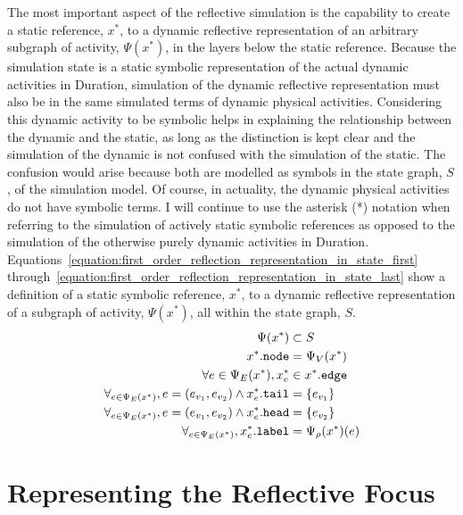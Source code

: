 The most important aspect of the reflective simulation is the
capability to create a static reference, $x^*$, to a dynamic
reflective representation of an arbitrary subgraph of activity,
$\Psi(x^*)$, in the layers below the static reference.  Because the
simulation state is a static symbolic representation of the actual
dynamic activities in Duration, simulation of the dynamic reflective
representation must also be in the same simulated terms of dynamic
physical activities.  Considering this dynamic activity to be symbolic
helps in explaining the relationship between the dynamic and the
static, as long as the distinction is kept clear and the simulation of
the dynamic is not confused with the simulation of the static.  The
confusion would arise because both are modelled as symbols in the
state graph, $S$, of the simulation model.  Of course, in actuality,
the dynamic physical activities do not have symbolic terms.  I will
continue to use the asterisk (*) notation when referring to the
simulation of actively static symbolic references as opposed to the
simulation of the otherwise purely dynamic activities in Duration.
{\mbox{Equations~\ref{equation:first_order_reflection_representation_in_state_first}}}
{\mbox{through~\ref{equation:first_order_reflection_representation_in_state_last}}}
show a definition of a static symbolic reference, $x^*$, to a dynamic
reflective representation of a subgraph of activity, $\Psi(x^*)$, all
within the state graph, $S$.
\begin{align}
\label{equation:first_order_reflection_representation_in_state_first}
                                                                    \Psi(x^*) &\subset S \\
                                                         x^*.\text{\tt{node}} &= \Psi_V(x^*) \\
                                               \forall e \in \Psi_E(x^*), x^*_e &\in x^*.\text{\tt{edge}} \\
   \forall_{e \in \Psi_E(x^*)}, e = (e_{v_1}, e_{v_2}) \wedge x^*_e.\text{\tt{tail}} &= \{e_{v_1}\} \\
   \forall_{e \in \Psi_E(x^*)}, e = (e_{v_1}, e_{v_2}) \wedge x^*_e.\text{\tt{head}} &= \{e_{v_2}\} \\
\label{equation:first_order_reflection_representation_in_state_last}
                              \forall_{e \in \Psi_E(x^*)}, x^*_e.\text{\tt{label}} &= \Psi_\rho(x^*)(e)
\end{align}

\section{Representing the Reflective Focus}

